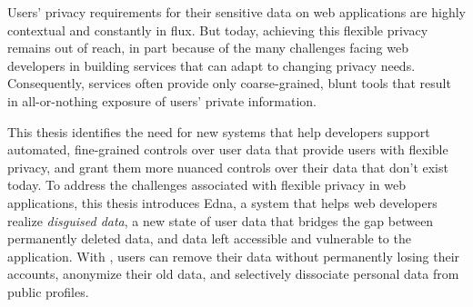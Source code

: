 Users' privacy requirements for their sensitive data on web applications are highly contextual and constantly in flux.  %
But today, achieving this flexible privacy remains out of reach, in part because
of the many challenges facing web developers in building services that can adapt
to changing privacy needs. Consequently, services often provide only
coarse-grained, blunt tools that result in all-or-nothing exposure of users’
private information.

This thesis identifies the need for new systems that help developers support
automated, fine-grained controls over user data that provide users with flexible
privacy, and grant them more nuanced controls over their data that don't exist
today.
%
To address the challenges associated with flexible privacy in web applications,
this thesis introduces Edna, a system that helps web developers realize
\emph{disguised data}, a new state of user data that bridges the gap between
permanently deleted data, and data left accessible and vulnerable to the
application.  With \sys, users can remove their data without permanently losing
their accounts, anonymize their old data, and selectively dissociate personal
data from public profiles.
%
